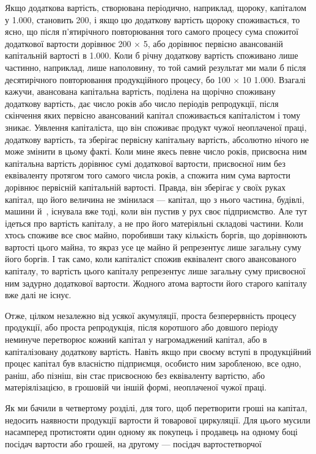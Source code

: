 Якщо додаткова вартість, створювана періодично, наприклад,
щороку, капіталом у \num{1.000}, становить 200, і якщо цю додаткову вартість щороку споживається,
то ясно, що після п’ятирічного повторювання того самого
процесу сума спожитої додаткової вартости дорівнює 200 × 5, або
дорівнює первісно авансованій капітальній вартості в \num{1.000}. Коли б річну додаткову вартість споживано лише
частинно, наприклад, лише наполовину, то той самий результат
ми мали б після десятирічного повторювання продукційного
процесу, бо 100 × 10 \deq{} \num{1.000}. Взагалі кажучи, авансована
капітальна вартість, поділена на щорічно споживану додаткову
вартість, дає число років або число періодів репродукції, після
скінчення яких первісно авансований капітал споживається
капіталістом і тому зникає. Уявлення капіталіста, що він споживає
продукт чужої неоплаченої праці, додаткову вартість,
та зберігає первісну капітальну вартість, абсолютно нічого не
може змінити в цьому факті. Коли мине якесь певне число років,
присвоєна ним капітальна вартість дорівнює сумі додаткової
вартости, присвоєної ним без еквіваленту протягом того самого
числа років, а спожита ним сума вартости дорівнює первісній
капітальній вартості. Правда, він зберігає у своїх руках капітал,
що його величина не змінилася — капітал, що з нього частина,
будівлі, машини й~, існувала вже тоді, коли він пустив у рух
своє підприємство. Але тут ідеться про вартість капіталу, а не
про його матеріяльні складові частини. Коли хтось споживе
все своє майно, поробивши таку кількість боргів, що дорівнюють
вартості цього майна, то якраз усе це майно й репрезентує лише
загальну суму його боргів. І так само, коли капіталіст спожив
еквівалент свого авансованого капіталу, то вартість цього капіталу
репрезентує лише загальну суму присвоєної ним задурно
додаткової вартости. Жодного атома вартости його старого капіталу
вже далі не існує.

Отже, цілком незалежно від усякої акумуляції, проста безперервність
процесу продукції, або проста репродукція, після
коротшого або довшого періоду неминуче перетворює кожний
капітал у нагромаджений капітал, або в капіталізовану додаткову
вартість. Навіть якщо при своєму вступі в продукційний процес
капітал був власністю підприємця, особисто ним заробленою,
все одно, раніш, або пізніш, він стає присвоєною без еквіваленту
вартістю, або матеріялізацією, в грошовій чи іншій формі, неоплаченої
чужої праці.

Як ми бачили в четвертому розділі, для того, щоб перетворити
гроші на капітал, недосить наявности продукції вартости й товарової
циркуляції. Для цього мусили насамперед протистояти
один одному як покупець і продавець на одному боці посідач
вартости або грошей, на другому — посідач вартостетворчої
\parbreak{}  %
